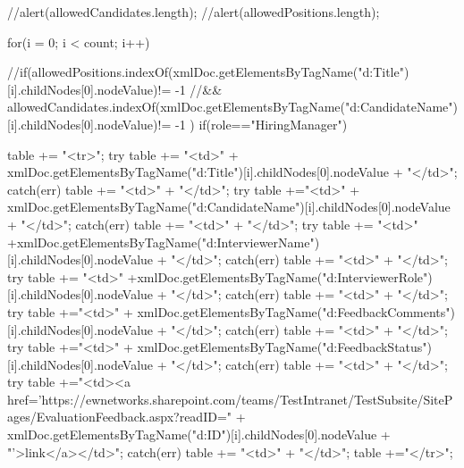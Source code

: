 {{{		
						//alert(allowedCandidates.length);
						//alert(allowedPositions.length);
						
						for(i = 0; i < count; i++) {
							
							//if(allowedPositions.indexOf(xmlDoc.getElementsByTagName("d:Title")[i].childNodes[0].nodeValue)!= -1 
							   //&& allowedCandidates.indexOf(xmlDoc.getElementsByTagName("d:CandidateName")[i].childNodes[0].nodeValue)!= -1 )
							   if(role=="HiringManager")
							{
								
								table += "<tr>";
								try{
									table += "<td>" + xmlDoc.getElementsByTagName("d:Title")[i].childNodes[0].nodeValue + "</td>";
								}
								catch(err)
								{
									table += "<td>" + "</td>";
								}
								try{
									table +="<td>" + xmlDoc.getElementsByTagName("d:CandidateName")[i].childNodes[0].nodeValue + "</td>";
								}
								catch(err)
								{
									table += "<td>" + "</td>";
								}
								try{
									table += "<td>" +xmlDoc.getElementsByTagName("d:InterviewerName")[i].childNodes[0].nodeValue + "</td>";
									}
								catch(err)
								{
									table += "<td>" + "</td>";
								}
								try{
								table += "<td>" +xmlDoc.getElementsByTagName("d:InterviewerRole")[i].childNodes[0].nodeValue + "</td>";
								}
								catch(err)
								{
									table += "<td>" + "</td>";
								}
								try{
								table +="<td>" + xmlDoc.getElementsByTagName("d:FeedbackComments")[i].childNodes[0].nodeValue + "</td>";
								}
								catch(err)
								{
									table += "<td>" + "</td>";
								}
								try {
								table +="<td>" + xmlDoc.getElementsByTagName("d:FeedbackStatus")[i].childNodes[0].nodeValue + "</td>";
								}
								catch(err)
								{
									table += "<td>" + "</td>";
								}
								try {
								table +="<td><a href='https://ewnetworks.sharepoint.com/teams/TestIntranet/TestSubsite/SitePages/EvaluationFeedback.aspx?readID=" + xmlDoc.getElementsByTagName("d:ID")[i].childNodes[0].nodeValue + "'>link</a></td>";
								}
								catch(err)
								{
									table += "<td>" + "</td>";
								}
								table +="</tr>";
								
}}}}}
